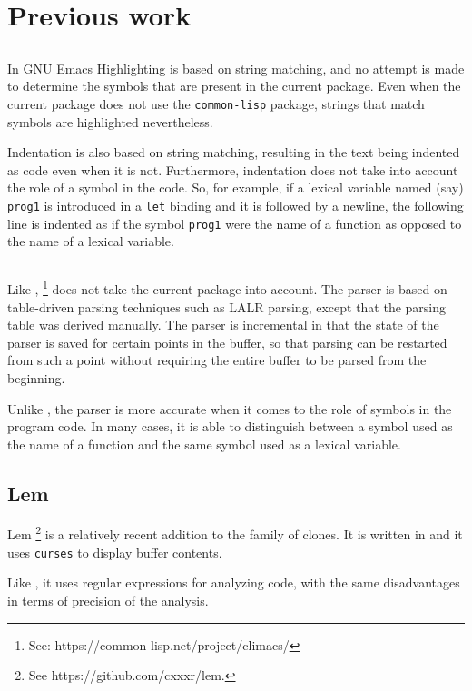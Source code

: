 \section{Previous work}

\subsection{\emacs{}}
\label{sec-previous-emacs}

In GNU Emacs
\cite{GNUEmacsLispReferenceManual,CraftOfTextEditiing,Finseth:1980:TPTa}
Highlighting is based on string matching, and no attempt is made to
determine the symbols that are present in the current package.
Even when the current package does not use the \texttt{common-lisp}
package, strings that match \commonlisp{} symbols are highlighted
nevertheless.

Indentation is also based on string matching, resulting in the text
being indented as \commonlisp{} code even when it is not.
Furthermore, indentation does not take into account the role of a
symbol in the code.  So, for example, if a lexical variable named
(say) \texttt{prog1} is introduced in a \texttt{let} binding and
it is followed by a newline, the following line is indented as if the
symbol \texttt{prog1} were the name of a \commonlisp{} function as
opposed to the name of a lexical variable.

\subsection{\climacs{}}

Like \emacs{}, \climacs{}%
\footnote{See: https://common-lisp.net/project/climacs/}
does not take the current package into
account.  The parser is based on table-driven parsing techniques
such as LALR parsing, except that the parsing table was derived
manually.  The parser is incremental in that the state of the parser
is saved for certain points in the buffer, so that parsing can be
restarted from such a point without requiring the entire buffer to be
parsed from the beginning.

Unlike \emacs{}, the \climacs{} parser is more accurate when it comes
to the role of symbols in the program code.  In many cases, it is able
to distinguish between a symbol used as the name of a function and the
same symbol used as a lexical variable.

\subsection{Lem}

Lem%
\footnote{See https://github.com/cxxxr/lem.}
is a relatively recent addition to the family of \emacs{} clones.  It
is written in \commonlisp{} and it uses \texttt{curses} to display
buffer contents.

Like \emacs{} , it uses regular expressions
for analyzing \commonlisp{} code, with the same disadvantages in terms
of precision of the analysis.
